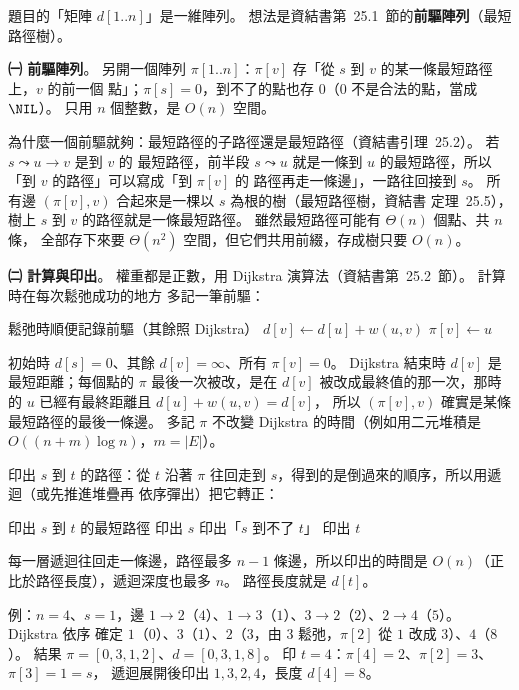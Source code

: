 \begin{pastsoln}
題目的「矩陣 $d[1..n]$」是一維陣列。 想法是資結書第~25.1~節的\textbf{前驅陣列}（最短路徑樹）。

\textbf{㈠ 前驅陣列}。 另開一個陣列 $\pi[1..n]$：$\pi[v]$ 存「從 $s$ 到 $v$ 的某一條最短路徑上，$v$ 的前一個
點」；$\pi[s] = 0$，到不了的點也存 $0$（$0$ 不是合法的點，當成 $\NIL$）。 只用 $n$ 個整數，是 $O(n)$ 空間。

為什麼一個前驅就夠：最短路徑的子路徑還是最短路徑（資結書引理~25.2）。 若 $s \leadsto u \to v$ 是到 $v$ 的
最短路徑，前半段 $s \leadsto u$ 就是一條到 $u$ 的最短路徑，所以「到 $v$ 的路徑」可以寫成「到 $\pi[v]$ 的
路徑再走一條邊」，一路往回接到 $s$。 所有邊 $(\pi[v], v)$ 合起來是一棵以 $s$ 為根的樹（最短路徑樹，資結書
定理~25.5），樹上 $s$ 到 $v$ 的路徑就是一條最短路徑。 雖然最短路徑可能有 $\Theta(n)$ 個點、共 $n$ 條，
全部存下來要 $\Theta(n^2)$ 空間，但它們共用前綴，存成樹只要 $O(n)$。

\textbf{㈡ 計算與印出}。 權重都是正數，用 Dijkstra 演算法（資結書第~25.2~節）。 計算時在每次鬆弛成功的地方
多記一筆前驅：
\begin{pseudo}[unbreakable]{鬆弛時順便記錄前驅（其餘照 Dijkstra）}
        \State $d[v] \gets d[u] + w(u, v)$
        \State $\pi[v] \gets u$ 
    \EndIf
\EndProcedure
\end{pseudo}
初始時 $d[s] = 0$、其餘 $d[v] = \infty$、所有 $\pi[v] = 0$。 Dijkstra 結束時 $d[v]$ 是最短距離；每個點的
$\pi$ 最後一次被改，是在 $d[v]$ 被改成最終值的那一次，那時的 $u$ 已經有最終距離且 $d[u] + w(u, v) = d[v]$，
所以 $(\pi[v], v)$ 確實是某條最短路徑的最後一條邊。 多記 $\pi$ 不改變 Dijkstra 的時間（例如用二元堆積是
$O((n + m) \log n)$，$m = |E|$）。

印出 $s$ 到 $t$ 的路徑：從 $t$ 沿著 $\pi$ 往回走到 $s$，得到的是倒過來的順序，所以用遞迴（或先推進堆疊再
依序彈出）把它轉正：
\begin{pseudo}[unbreakable]{印出 $s$ 到 $t$ 的最短路徑}
        \State 印出 $s$
        \State 印出「$s$ 到不了 $t$」
    \Else
        \State {}
        \State 印出 $t$
    \EndIf
\EndProcedure
\end{pseudo}
每一層遞迴往回走一條邊，路徑最多 $n - 1$ 條邊，所以印出的時間是 $O(n)$（正比於路徑長度），遞迴深度也最多
$n$。 路徑長度就是 $d[t]$。

例：$n = 4$、$s = 1$，邊 $1 \to 2$（$4$）、$1 \to 3$（$1$）、$3 \to 2$（$2$）、$2 \to 4$（$5$）。 Dijkstra 依序
確定 $1$（$0$）、$3$（$1$）、$2$（$3$，由 $3$ 鬆弛，$\pi[2]$ 從 $1$ 改成 $3$）、$4$（$8$）。 結果
$\pi = [0, 3, 1, 2]$、$d = [0, 3, 1, 8]$。 印 $t = 4$：$\pi[4] = 2$、$\pi[2] = 3$、$\pi[3] = 1 = s$，
遞迴展開後印出 $1, 3, 2, 4$，長度 $d[4] = 8$。
\end{pastsoln}
